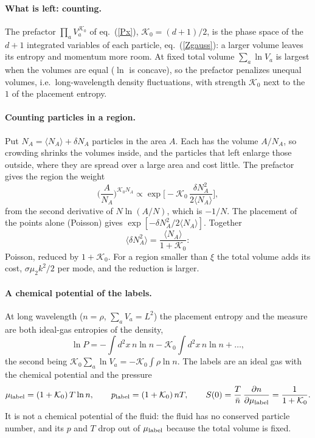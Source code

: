 \documentclass[11pt,aps,preprint,nofootinbib,superscriptaddress,tightenlines]{revtex4-2}
\newcommand{\avg}[1]{\langle #1\rangle}
\def\st{\begin{equation}}
\def\stp{\end{equation}}
\def\Eq#1{eq.~(\ref{#1})}
\let\oldparagraph\paragraph
\renewcommand{\paragraph}{\par\bigskip\oldparagraph}
\begin{document}
\paragraph{What is left: counting.}  The prefactor $\prod_aV_a^{\mathcal K_0}$ of \Eq{Px}, $\mathcal K_0=(d+1)/2$, is the phase space of the $d+1$ integrated variables of
each particle, \Eq{Zgauss}: a larger volume leaves its entropy and momentum more room.  At fixed total volume $\sum_a\ln V_a$ is largest
when the volumes are equal ($\ln$ is concave), so the prefactor penalizes unequal volumes, i.e.\ long-wavelength density fluctuations,
with strength $\mathcal K_0$ next to the $1$ of the placement entropy.

\paragraph{Counting particles in a region.}  Put $N_A=\avg{N_A}+\delta N_A$ particles in the area $A$.  Each has the volume $A/N_A$, so crowding
shrinks the volumes inside, and the particles that left enlarge those outside, where they are spread over a large area and cost little.  The
prefactor gives the region the weight
\st
\Big(\frac{A}{N_A}\Big)^{\mathcal K_0 N_A}\propto\exp\Big[-\mathcal K_0\,\frac{\delta N_A^2}{2\avg{N_A}}\Big],
\stp
from the second derivative of $N\ln(A/N)$, which is $-1/N$.  The placement of the points alone (Poisson) gives $\exp[-\delta N_A^2/2\avg{N_A}]$.
Together
\st
\avg{\delta N_A^2}=\frac{\avg{N_A}}{1+\mathcal K_0} :
\stp
Poisson, reduced by $1+\mathcal K_0$.  For a region smaller than $\xi$ the total volume adds its cost, $\sigma\mu_2k^2/2$ per mode, and the reduction is larger.

\paragraph{A chemical potential of the labels.}  At long wavelength ($n=\rho$, $\sum_aV_a=L^2$) the placement entropy and the measure are both
ideal-gas entropies of the density,
\st
\ln P=-\int d^2x\,n\ln n-\mathcal K_0\int d^2x\,n\ln n+\dots,
\stp
the second being $\mathcal K_0\sum_a\ln V_a=-\mathcal K_0\int\rho\ln n$.  The labels are an ideal gas with the chemical potential and the pressure
\st
\mu_{\rm label}=(1+\mathcal K_0)\,T\ln n,\qquad p_{\rm label}=(1+\mathcal K_0)\,nT,\qquad
S(0)=\frac T{\bar n}\,\frac{\partial n}{\partial\mu_{\rm label}}=\frac1{1+\mathcal K_0} .
\stp
It is not a chemical potential of the fluid: the fluid has no conserved particle number, and its $p$ and $T$ drop out of $\mu_{\rm label}$ because
the total volume is fixed.
\end{document}
